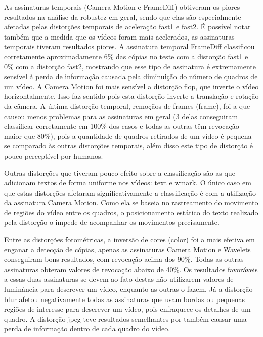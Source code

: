
As assinaturas temporais (Camera Motion e FrameDiff) obtiveram os piores resultados na análise da robustez em geral, sendo que elas são especialmente afetadas pelas distorções temporais de aceleração fast1 e fast2. É possível notar também que a medida que os vídeos foram mais acelerados, as assinaturas temporais tiveram resultados piores. A assinatura temporal FrameDiff classificou corretamente aproximadamente 6\% das cópias no teste com a distorção fast1 e 0\% com a distorção fast2, mostrando que esse tipo de assinatura é extremamente sensível à perda de informação causada pela diminuição do número de quadros de um vídeo. A Camera Motion foi mais sensível a distorção flop, que inverte o vídeo horizontalmente. Isso faz sentido pois esta distorção inverte a translação e rotação da câmera. A última distorção temporal, remoçãos de frames (frame), foi a que causou menos problemas para as assinaturas em geral (3 delas conseguiram classificar corretamente em 100\% dos casos e todas as outras têm revocação maior que 80\%), pois a quantidade de quadros retirados de um vídeo é pequena se comparado às outras distorções temporais, além disso este tipo de distorção é pouco perceptível por humanos.

Outras distorções que tiveram pouco efeito sobre a classificação são as que adicionam textos de forma uniforme nos vídeos: text e wmark. O único caso em que estas distorções afetaram significativamente a classificação é com a utilização da assinatura Camera Motion. Como ela se baseia no rastreamento do movimento de regiões do vídeo entre os quadros, o posicionamento estático do texto realizado pela distorção o impede de acompanhar os movimentos precisamente.

Entre as distorções fotométricas, a inversão de cores (color) foi a mais efetiva em enganar a detecção de cópias, apenas as assinaturas Camera Motion e Wavelets conseguiram bons resultados, com revocação acima dos 90\%. Todas as outras assinaturas obteram valores de revocação abaixo de 40\%. Os resultados favoráveis a essas duas assinaturas se devem ao fato destas não utilizarem valores de luminância para descrever um vídeo, enquanto as outras o fazem. Já a distorção blur afetou negativamente todas as assinaturas que usam bordas ou pequenas regiões de interesse para descrever um vídeo, pois enfraquece os detalhes de um quadro. A distorção jpeg teve resultados semelhantes por também causar uma perda de informação dentro de cada quadro do vídeo. 

